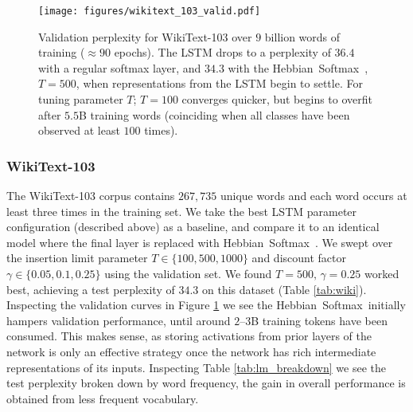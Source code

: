 \documentclass{article} \usepackage{hyperref}
\newcommand{\model}{\hbox{Hebbian Softmax }}
\begin{document}
\begin{figure}[]
    \centering
    \texttt{[image: figures/wikitext\_103\_valid.pdf]}
    \caption{Validation perplexity for WikiText-103 over $9$ billion words of training ($\approx 90$ epochs).
    The LSTM drops to a perplexity of $36.4$ with a regular softmax layer, and $34.3$ with the \model, $T=500$, when representations from the LSTM begin to settle. For tuning parameter $T$; $T=100$ converges quicker, but begins to overfit after $5.5$B training words (coinciding when all classes have been observed at least $100$ times).}
    \label{fig:wiki_valid}
\end{figure}

\subsubsection{WikiText-103}
The WikiText-103 corpus contains $267,735$ unique words and each word occurs at least three times in the training set. We take the best LSTM parameter configuration (described above) as a baseline, and compare it to an identical model where the final layer is replaced with \model. We swept over the insertion limit parameter $T \in \{100, 500, 1000\}$ and discount factor $\gamma \in \{0.05, 0.1, 0.25\}$ using the validation set. We found $T = 500, \, \gamma = 0.25$ worked best, achieving a test perplexity of $34.3$ on this dataset (Table \ref{tab:wiki}). Inspecting the validation curves in Figure \ref{fig:wiki_valid} we see the \model initially hampers validation performance, until around $2$--$3$B training tokens have been consumed. This makes sense, as storing activations from prior layers of the network is only an effective strategy once the network has rich intermediate representations of its inputs. Inspecting Table \ref{tab:lm_breakdown} we see the test perplexity broken down by word frequency, the gain in overall performance is obtained from less frequent vocabulary.
\end{document}
